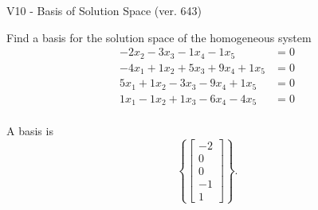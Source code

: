 \begin{exercise}
  \begin{exerciseTitle}V10 - Basis of Solution Space (ver. 643)\end{exerciseTitle}
  \begin{exerciseStatement}
    Find a basis for the solution space of the homogeneous system 
\begin{align*}
 -2 x_ 2 -3 x_ 3 -1 x_ 4 -1 x_ 5 &= 0  \\ 
  -4 x_ 1 + 1 x_ 2 + 5 x_ 3 + 9 x_ 4 + 1 x_ 5 &= 0  \\ 
  5 x_ 1 + 1 x_ 2 -3 x_ 3 -9 x_ 4 + 1 x_ 5 &= 0  \\ 
  1 x_ 1 -1 x_ 2 + 1 x_ 3 -6 x_ 4 -4 x_ 5 &= 0  \\ 
 \end{align*}


 
  \end{exerciseStatement}

  \begin{exerciseAnswer}
   A basis is   
\[\left\{\left[\begin{array}{c}
-2 \\
0 \\
0 \\
-1 \\
1
\end{array}\right]\right\}.\]

  


  \end{exerciseAnswer}
\end{exercise}